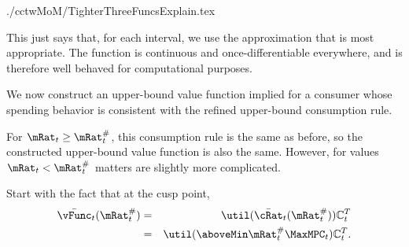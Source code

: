 \documentclass[titlepage]{\econtex}
\begin{document}
\begin{verbatimwrite}{./cctwMoM/TighterThreeFuncsExplain.tex}

  This just says that, for each interval, we use the approximation that
  is most appropriate.  The function is continuous and
  once-differentiable everywhere, and is therefore well behaved for
  computational purposes.

  We now construct an upper-bound value function implied for a consumer whose spending behavior
  is consistent with the refined upper-bound consumption rule.  

  For $\mRat_{t} \geq \mRat_{t}^{\#}$, this consumption rule is the same as before,
  so the constructed upper-bound value function is also the same.  However, for 
  values $\mRat_{t} < \mRat_{t}^{\#}$ matters are slightly more complicated.  

  Start with the fact that at the cusp point, 
  \begin{eqnarray*}
    \bar{\vFunc}_{t}(\mtCusp) & = & \util(\bar{\cRat}_{t}(\mtCusp))\mathbb{C}_{t}^{T} \\
                              &=& \util(\aboveMin \mtCusp  \MaxMPC_{t})\mathbb{C}_{t}^{T}
                                  .
  \end{eqnarray*}


\end{verbatimwrite}
\end{document}
